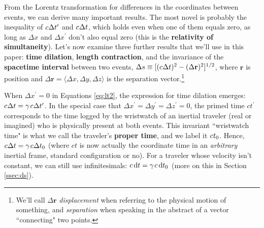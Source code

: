 \documentclass[12pt]{article}
\renewcommand{\vv}[1]{\mathbf{#1}}
\newcommand{\dd}[1]{\mathrm{d}#1}
\begin{document}
From the Lorentz transformation for differences in the coordinates between events, we can derive many important results. The most novel is probably the inequality of $c \mkern.5mu \Delta t^{\prime}$ and $c \mkern.5mu \Delta t$, which holds even when one of them equals zero, as long as $\Delta x$ and $\Delta x^\prime$ don't also equal zero (this is the \textbf{relativity of simultaneity}). Let's now examine three further results that we'll use in this paper: \textbf{time dilation}, \textbf{length contraction}, and the invariance of the \textbf{spacetime interval} between two events, $\Delta s \equiv [(c \mkern.5mu \Delta t)^2 - ( \Delta \vv r )^2]^{1/2}$, where $\vv r$ is position and ${\Delta \vv r = \langle \Delta x, \Delta y, \Delta z \rangle}$ is the separation vector.\footnote{We'll call $\Delta \vv r$ \emph{displacement} when referring to the physical motion of something, and \emph{separation} when speaking in the abstract of a vector ``connecting" two points.}

When $\Delta x^{\prime} = 0$ in Equations \ref{eq:lt2}, the expression for time dilation emerges: $c \mkern.5mu \Delta t = \gamma \mkern2mu c \mkern.5mu \Delta t^{\prime}$. In the special case that $\Delta x^{\prime} = \Delta y^{\prime} = \Delta z^{\prime} = 0$, the primed time $ct^{\prime}$ corresponds to the time logged by the wristwatch of an inertial traveler (real or imagined) who is physically present at both events. This invariant ``wristwatch time" is what we call the traveler's \textbf{proper time}, and we label it $c \mkern.5mu t_0$. Hence, $c \mkern.5mu \Delta t = \gamma \mkern2mu c \mkern.5mu \Delta t_0$ (where $ct$ is now actually the coordinate time in an \emph{arbitrary} inertial frame, standard configuration or no). For a traveler whose velocity isn't constant, we can still use infinitesimals: $c \, \dd t = \gamma \mkern2mu c \, \dd t_0$ (more on this in Section \ref{ssec:ds}).
\end{document}
